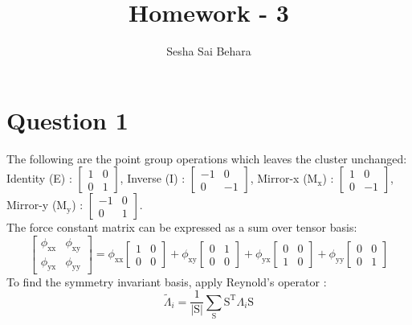 \documentclass[a4paper]{article}
\title{Homework - 3}
\author{Sesha Sai Behara}
\begin{document}
\maketitle
\section*{Question 1}
The following are the point group operations which leaves the cluster unchanged:\\
Identity (E) : $\begin{bmatrix} 1 & 0 \\ 0 & 1 \end{bmatrix}$,
Inverse (I) : $\begin{bmatrix} -1 & 0 \\ 0 & -1 \end{bmatrix}$,
Mirror-x (M$_\mathrm{x}$) : $\begin{bmatrix} 1 & 0 \\ 0 & -1 \end{bmatrix}$,
Mirror-y (M$_\mathrm{y}$) : $\begin{bmatrix} -1 & 0 \\ 0 & 1 \end{bmatrix}$.\\
\newline
The force constant matrix can be expressed as a sum over tensor basis:
\begin{equation}
    \begin{bmatrix}
        \phi_{\mathrm{xx}} & \phi_{\mathrm{xy}} \\
        \phi_{\mathrm{yx}} & \phi_{\mathrm{yy}}
    \end{bmatrix} = \phi_{\mathrm{xx}}\begin{bmatrix} 1 & 0 \\ 0 & 0 \end{bmatrix} + \phi_{\mathrm{xy}}\begin{bmatrix} 0 & 1\\ 0 & 0\end{bmatrix} + \phi_{\mathrm{yx}} \begin{bmatrix} 0 & 0 \\ 1 & 0 \end{bmatrix} + \phi_{\mathrm{yy}} \begin{bmatrix} 0 & 0 \\ 0 & 1 \end{bmatrix}      
\end{equation}
To find the symmetry invariant basis, apply Reynold's operator :
\begin{equation}
    \tilde{\Lambda}_{i} =\frac{1}{|\mathrm{S}|}\sum_{\mathrm{S}} \mathrm{S}^{\mathrm{T}} \Lambda_{i}\mathrm{S}
\end{equation}
\end{document}
